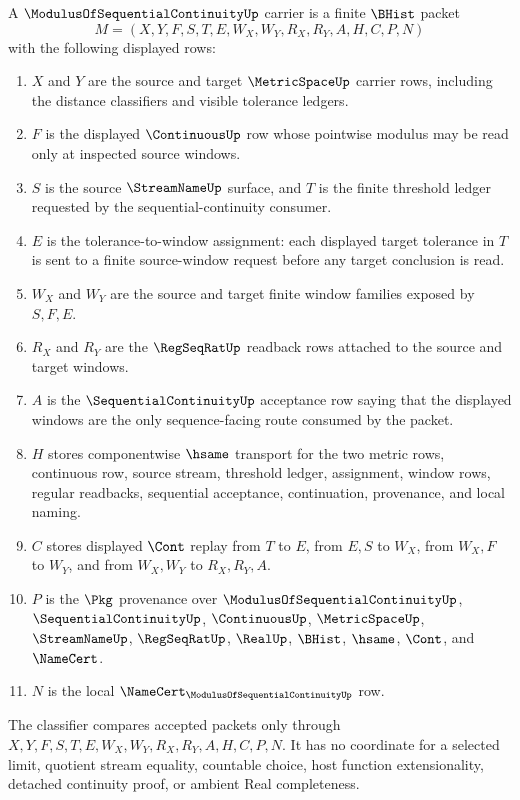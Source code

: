 \begin{definition}
\label{def:modulus-of-sequential-continuity-carrier}
A $\ModulusOfSequentialContinuityUp$ carrier is a finite $\BHist$ packet
$$
M=(X,Y,F,S,T,E,W_X,W_Y,R_X,R_Y,A,H,C,P,N)
$$
with the following displayed rows:
\begin{enumerate}
\item $X$ and $Y$ are the source and target $\MetricSpaceUp$ carrier rows, including the distance classifiers and visible tolerance ledgers.
\item $F$ is the displayed $\ContinuousUp$ row whose pointwise modulus may be read only at inspected source windows.
\item $S$ is the source $\StreamNameUp$ surface, and $T$ is the finite threshold ledger requested by the sequential-continuity consumer.
\item $E$ is the tolerance-to-window assignment: each displayed target tolerance in $T$ is sent to a finite source-window request before any target conclusion is read.
\item $W_X$ and $W_Y$ are the source and target finite window families exposed by $S,F,E$.
\item $R_X$ and $R_Y$ are the $\RegSeqRatUp$ readback rows attached to the source and target windows.
\item $A$ is the $\SequentialContinuityUp$ acceptance row saying that the displayed windows are the only sequence-facing route consumed by the packet.
\item $H$ stores componentwise $\hsame$ transport for the two metric rows, continuous row, source stream, threshold ledger, assignment, window rows, regular readbacks, sequential acceptance, continuation, provenance, and local naming.
\item $C$ stores displayed $\Cont$ replay from $T$ to $E$, from $E,S$ to $W_X$, from $W_X,F$ to $W_Y$, and from $W_X,W_Y$ to $R_X,R_Y,A$.
\item $P$ is the $\Pkg$ provenance over $\ModulusOfSequentialContinuityUp$, $\SequentialContinuityUp$, $\ContinuousUp$, $\MetricSpaceUp$, $\StreamNameUp$, $\RegSeqRatUp$, $\RealUp$, $\BHist$, $\hsame$, $\Cont$, and $\NameCert$.
\item $N$ is the local $\NameCert_{\ModulusOfSequentialContinuityUp}$ row.
\end{enumerate}
The classifier compares accepted packets only through $X,Y,F,S,T,E,W_X,W_Y,R_X,R_Y,A,H,C,P,N$. It has no coordinate for a selected limit, quotient stream equality, countable choice, host function extensionality, detached continuity proof, or ambient Real completeness.
\end{definition}

